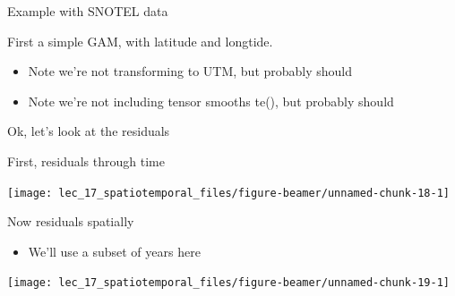 \documentclass[
  ignorenonframetext,
]{beamer}
\newenvironment{Shaded}{\begin{snugshade}}{\end{snugshade}}
\newcommand{\DataTypeTok}[1]{\textcolor[rgb]{0.13,0.29,0.53}{#1}}
\newcommand{\KeywordTok}[1]{\textcolor[rgb]{0.13,0.29,0.53}{\textbf{#1}}}
\newcommand{\NormalTok}[1]{#1}
\newcommand{\OperatorTok}[1]{\textcolor[rgb]{0.81,0.36,0.00}{\textbf{#1}}}
\newcommand{\StringTok}[1]{\textcolor[rgb]{0.31,0.60,0.02}{#1}}
\providecommand{\tightlist}{%
  \setlength{\itemsep}{0pt}\setlength{\parskip}{0pt}}
\begin{document}
\begin{frame}[fragile]{Example with SNOTEL data}
\protect\hypertarget{example-with-snotel-data}{}

First a simple GAM, with latitude and longtide.

\begin{itemize}
\tightlist
\item
  Note we're not transforming to UTM, but probably should
\item
  Note we're not including tensor smooths te(), but probably should
\end{itemize}

\begin{Shaded}
\end{Shaded}

\end{frame}

\begin{frame}{Ok, let's look at the residuals}
\protect\hypertarget{ok-lets-look-at-the-residuals}{}

First, residuals through time

\begin{center}\texttt{[image: lec\_17\_spatiotemporal\_files/figure-beamer/unnamed-chunk-18-1]} \end{center}

\end{frame}

\begin{frame}{Now residuals spatially}
\protect\hypertarget{now-residuals-spatially}{}

\begin{itemize}
\tightlist
\item
  We'll use a subset of years here
\end{itemize}

\begin{center}\texttt{[image: lec\_17\_spatiotemporal\_files/figure-beamer/unnamed-chunk-19-1]} \end{center}

\end{frame}
\end{document}

